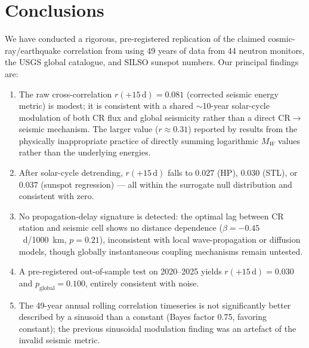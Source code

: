 \documentclass[12pt,a4paper]{article}
\begin{document}
\section{Conclusions}
\label{sec:conclusions}

We have conducted a rigorous, pre-registered replication of the claimed
cosmic-ray/earthquake correlation from \citet{Homola2023} using 49 years of
data from 44 neutron monitors, the USGS global catalogue, and SILSO sunspot
numbers.
Our principal findings are:

\begin{enumerate}
  \item The raw cross-correlation $r(+15\,\text{d}) = 0.081$ (corrected seismic
    energy metric) is modest; it is consistent with a shared $\sim$10-year
    solar-cycle modulation of both CR flux and global seismicity rather than
    a direct CR$\to$seismic mechanism.
    The larger value ($r \approx 0.31$) reported by \citet{Homola2023} results
    from the physically inappropriate practice of directly summing logarithmic
    $M_W$ values rather than the underlying energies.

  \item After solar-cycle detrending, $r(+15\,\text{d})$ falls to $0.027$ (HP),
    $0.030$ (STL), or $0.037$ (sunspot regression) --- all within the surrogate
    null distribution and consistent with zero.

  \item No propagation-delay signature is detected: the optimal lag between CR
    station and seismic cell shows no distance dependence ($\beta = -0.45$~d/1000~km,
    $p = 0.21$), inconsistent with local wave-propagation or diffusion models,
    though globally instantaneous coupling mechanisms remain untested.

  \item A pre-registered out-of-sample test on 2020--2025 yields
    $r(+15\,\text{d}) = 0.030$ and $p_\text{global} = 0.100$, entirely
    consistent with noise.

  \item The 49-year annual rolling correlation timeseries is not significantly
    better described by a sinusoid than a constant (Bayes factor 0.75, favoring
    constant); the previous sinusoidal modulation finding was an artefact of the
    invalid seismic metric.


\end{enumerate}
\end{document}
